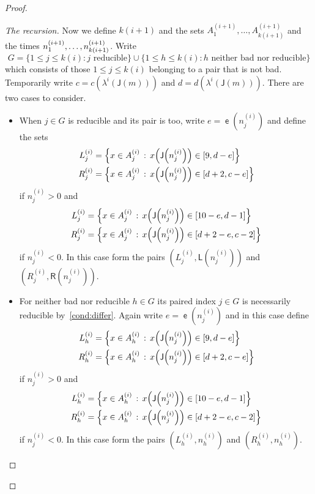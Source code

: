 \documentclass[10pt]{amsart}
\theoremstyle{definition}\newtheorem{defi}[theo]{Definition}\newtheorem{rema}[theo]{Remark}\newtheorem{exam}[theo]{Example}\newtheorem{exem}[theo]{Example}\newtheorem{nota}[theo]{Notation}
\DeclareMathOperator{\lst}{\mathsf{e}}
\newcommand{\lft}{\mathsf{L}}
\newcommand{\rht}{\mathsf{R}}
\newcommand{\scl}{\mathsf{J}}
\let\originalleft\left
\let\originalright\right
\renewcommand{\left}{\mathopen{}\mathclose\bgroup\originalleft}
\renewcommand{\right}{\aftergroup\egroup\originalright}
\begin{document}
\begin{proof}
\begin{proof}[{The recursion}]
Now we define $k(i+1)$ and the sets $A^{(i+1)}_1,\dots,A^{(i+1)}_{k(i+1)}$ and the times $n^{(i+1)}_1,\dots,\linebreak n^{(i+1)}_{k(i+1)}$. Write
\[
G = \{ 1 \le j \le k(i) : j \text{ reducible} \} \cup \{ 1 \le h \le k(i) : h \text{ neither bad nor reducible} \}
\]
which consists of those $1 \le j \le k(i)$ belonging to a pair that is not bad. Temporarily write $c = c(\lambda^i(\scl(m)))$ and $d = d(\lambda^i(\scl(m)))$. There are two cases to consider.
\begin{itemize}
\item When $j \in G$ is reducible and its pair is too, write $e = \lst(n^{(i)}_j)$ and define the sets
\begin{align*}
L^{(i)}_j &= \left\{ x \in A^{(i)}_j \,:\, x\left(\scl\left(n^{(i)}_j\right)\right) \in [9,d-e] \right\} \\
R^{(i)}_j &= \left\{ x \in A^{(i)}_j \,:\, x\left(\scl\left(n^{(i)}_j\right)\right) \in [d+2,c-e] \right\}
\end{align*}
if $n^{(i)}_j > 0$ and
\begin{align*}
L^{(i)}_j &= \left\{ x \in A^{(i)}_j \,:\, x\left(\scl\left(n^{(i)}_j\right)\right) \in [10-e,d-1] \right\} \\
R^{(i)}_j &= \left\{ x \in A^{(i)}_j \,:\, x\left(\scl\left(n^{(i)}_j\right)\right) \in [d+2-e,c-2] \right\}
\end{align*}
if $n^{(i)}_j < 0$. In this case form the pairs $(L^{(i)}_j, \lft(n^{(i)}_j))$ and $(R^{(i)}_j, \rht(n^{(i)}_j))$.
\item For neither bad nor reducible $h \in G$ its paired index $j \in G$ is necessarily reducible by~\eqref{cond:differ}. Again write $e = \lst(n^{(i)}_j)$ and in this case define
\begin{align*}
L^{(i)}_h &= \left\{ x \in A^{(i)}_h \,:\, x\left(\scl\left(n^{(i)}_j\right)\right) \in [9,d-e] \right\} \\
R^{(i)}_h &= \left\{ x \in A^{(i)}_h \,:\, x\left(\scl\left(n^{(i)}_j\right)\right) \in [d+2,c-e] \right\}
\end{align*}
if $n^{(i)}_j > 0$ and
\begin{align*}
L^{(i)}_h &= \left\{ x \in A^{(i)}_h \,:\, x\left(\scl\left(n^{(i)}_j\right)\right) \in [10-e,d-1] \right\} \\
R^{(i)}_h &= \left\{ x \in A^{(i)}_h \,:\, x\left(\scl\left(n^{(i)}_j\right)\right) \in [d+2-e,c-2] \right\}
\end{align*}
if $n^{(i)}_j < 0$. In this case form the pairs $(L^{(i)}_h, n^{(i)}_h)$ and $(R^{(i)}_h, n^{(i)}_h)$.
\end{itemize}


\end{proof}
\end{proof}
\end{document}
